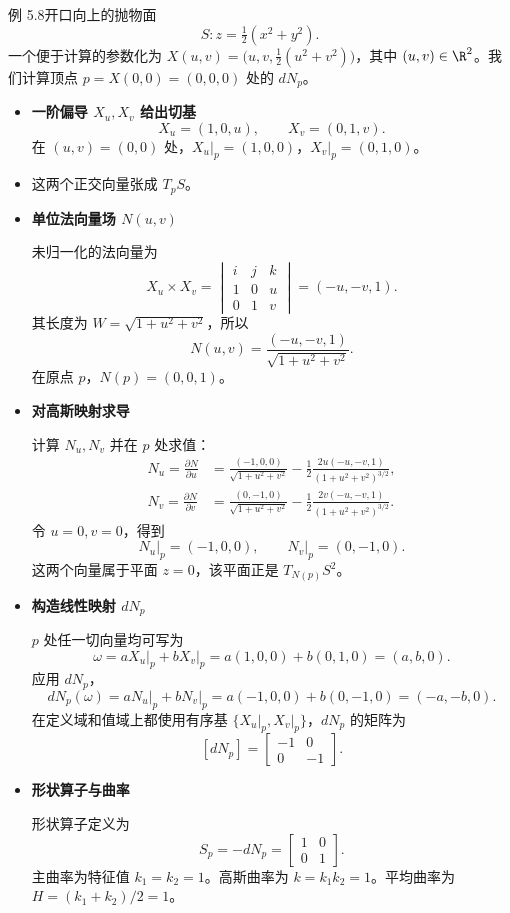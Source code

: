 \begin{statement}{例 5.8}{开口向上的抛物面}
\[
  S\colon z=\tfrac12(x^2+y^2).
\]
一个便于计算的参数化为 $X(u,v)=\bigl(u,v,\frac12(u^2+v^2)\bigr)$，其中 $(u,v)\in\R^2$。我们计算顶点 $p=X(0,0)=(0,0,0)$ 处的 $dN_p$。
\begin{itemize}
  \item \textbf{一阶偏导 $X_u,X_v$ 给出切基}
  \[
    X_u=(1,0,u),\qquad X_v=(0,1,v).
  \]
  在 $(u,v)=(0,0)$ 处，$\left.X_u\right|_p=(1,0,0)$，$\left.X_v\right|_p=(0,1,0)$。
  \item 这两个正交向量张成 $T_pS$。
  \item \textbf{单位法向量场 $N(u,v)$}

  未归一化的法向量为
  \[
    X_u\times X_v=\begin{vmatrix}i&j&k\\1&0&u\\0&1&v\end{vmatrix}
        =(-u,-v,1).
  \]
  其长度为 $W=\sqrt{1+u^2+v^2}$，所以
  \[
    N(u,v)=\frac{(-u,-v,1)}{\sqrt{1+u^2+v^2}}.
  \]
  在原点 $p$，$N(p)=(0,0,1)$。
  \item \textbf{对高斯映射求导}

  计算 $N_u,N_v$ 并在 $p$ 处求值：
  \[
    \begin{aligned}
      N_u=\frac{\partial N}{\partial u}
        &=\frac{(-1,0,0)}{\sqrt{1+u^2+v^2}}
          -\frac12\frac{2u(-u,-v,1)}{(1+u^2+v^2)^{3/2}},\\
      N_v=\frac{\partial N}{\partial v}
        &=\frac{(0,-1,0)}{\sqrt{1+u^2+v^2}}
          -\frac12\frac{2v(-u,-v,1)}{(1+u^2+v^2)^{3/2}}.
    \end{aligned}
  \]
  令 $u=0,v=0$，得到
  \[
    \left.N_u\right|_p=(-1,0,0),\qquad \left.N_v\right|_p=(0,-1,0).
  \]
  这两个向量属于平面 $z=0$，该平面正是 $T_{N(p)}S^2$。
  \item \textbf{构造线性映射 $dN_p$}

  $p$ 处任一切向量均可写为
  \[
    \omega=a\left.X_u\right|_p+b\left.X_v\right|_p
      =a(1,0,0)+b(0,1,0)=(a,b,0).
  \]
  应用 $dN_p$，
  \[
    dN_p(\omega)=a\left.N_u\right|_p+b\left.N_v\right|_p
      =a(-1,0,0)+b(0,-1,0)=(-a,-b,0).
  \]
  在定义域和值域上都使用有序基 $\{\left.X_u\right|_p,\left.X_v\right|_p\}$，$dN_p$ 的矩阵为
  \[
    [dN_p]=\begin{bmatrix}-1&0\\0&-1\end{bmatrix}.
  \]
  \item \textbf{形状算子与曲率}

  形状算子定义为
  \[
    S_p=-dN_p=\begin{bmatrix}1&0\\0&1\end{bmatrix}.
  \]
  主曲率为特征值 $k_1=k_2=1$。高斯曲率为 $k=k_1k_2=1$。平均曲率为
  $H=(k_1+k_2)/2=1$。
\end{itemize}
\end{statement}
